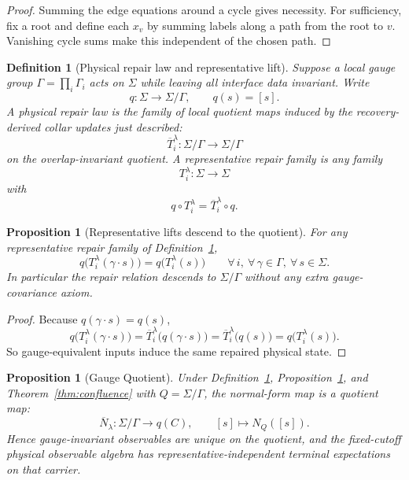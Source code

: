 \documentclass[11pt]{article}
\newtheorem{proposition}[theorem]{Proposition}
\newtheorem{definition}[theorem]{Definition}
\begin{document}
\begin{proof}
Summing the edge equations around a cycle gives necessity. For sufficiency, fix a root and define each $x_v$ by summing labels along a path from the root to $v$. Vanishing cycle sums make this independent of the chosen path.
\end{proof}

\begin{definition}[Physical repair law and representative lift]\label{def:physicalrepair}
Suppose a local gauge group $\Gamma=\prod_i \Gamma_i$ acts on $\Sigma$ while leaving all interface
data invariant. Write
\[
q:\Sigma\to\Sigma/\Gamma,
\qquad
q(s)=[s].
\]
A physical repair law is the family of local quotient maps induced by the
recovery-derived collar updates just described:
\[
\overline T_i^\lambda:\Sigma/\Gamma\to\Sigma/\Gamma
\]
on the overlap-invariant quotient. A representative repair family is any family
\[
T_i^\lambda:\Sigma\to\Sigma
\]
with
\[
q\circ T_i^\lambda=\overline T_i^\lambda\circ q.
\]
\end{definition}

\begin{proposition}[Representative lifts descend to the quotient]\label{prop:repairquot}
For any representative repair family of Definition~\ref{def:physicalrepair},
\[
q\bigl(T_i^\lambda(\gamma\cdot s)\bigr)=q\bigl(T_i^\lambda(s)\bigr)
\qquad
\forall\, i,\ \forall\, \gamma\in\Gamma,\ \forall\, s\in\Sigma.
\]
In particular the repair relation descends to \(\Sigma/\Gamma\) without any extra
gauge-covariance axiom.
\end{proposition}

\begin{proof}
Because \(q(\gamma\cdot s)=q(s)\),
\[
q\bigl(T_i^\lambda(\gamma\cdot s)\bigr)
=
\overline T_i^\lambda\bigl(q(\gamma\cdot s)\bigr)
=
\overline T_i^\lambda\bigl(q(s)\bigr)
=
q\bigl(T_i^\lambda(s)\bigr).
\]
So gauge-equivalent inputs induce the same repaired physical state.
\end{proof}

\begin{proposition}[Gauge Quotient]\label{prop:gauge}
Under Definition~\ref{def:physicalrepair}, Proposition~\ref{prop:repairquot}, and
Theorem~\ref{thm:confluence} with \(Q=\Sigma/\Gamma\), the normal-form map is a quotient map:
\[
\overline N_\lambda:\Sigma/\Gamma\to q(C),
\qquad
[s]\mapsto N_Q([s]).
\]
Hence gauge-invariant observables are unique on the quotient, and the fixed-cutoff physical
observable algebra has representative-independent terminal expectations on that carrier.
\end{proposition}
\end{document}
